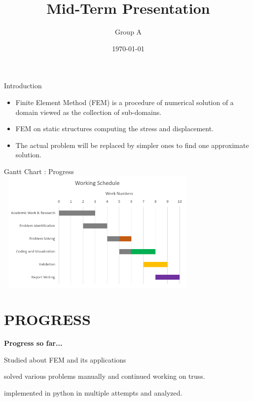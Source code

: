 \documentclass{beamer}
\title{Mid-Term Presentation}
\author{Group A}
\date{\today}
\begin{document}
\begin{frame}
    \titlepage 
\end{frame}

\logo{}

	
\begin{frame}{Introduction}
	\begin{itemize}
		\item  Finite Element Method (FEM) is a procedure of numerical solution of a domain viewed as the collection of sub-domains.
		\vspace{0.6cm}
		\item FEM on static structures computing the stress and displacement.
		\vspace{0.6cm}
		\item The actual problem will be replaced by simpler ones to find one approximate solution. 
	\end{itemize}
	
\end{frame}


\begin{frame}{Gantt Chart : Progress}
	\includegraphics[width = 10cm, height = 6cm]{progress.png}
\end{frame}


\section{{PROGRESS}}
\begin{frame}[t]{\textbf{\huge{Progress so far...}}}\vspace{20pt}
	\begin{block} {\textbf{}}
		Studied about FEM and its applications
	\end{block}  \vspace{20pt}
	
	\begin{block} {\textbf{}}
		solved various problems manually and  continued working on truss.
	\end{block}  \vspace{20pt}
	\begin{alertblock}{\textbf{}}
		implemented in python in multiple attempts  and analyzed. 
	\end{alertblock}  \vspace{20pt}
\end{frame}
\end{document}
